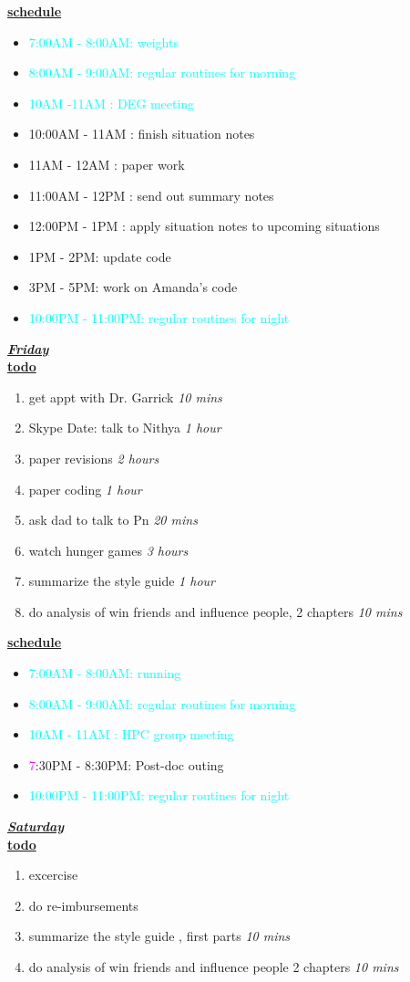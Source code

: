 \documentclass[8pt]{article}
\newcommand{\timeEst}[1]{\textit{#1}}
\newcommand{\regItem}[1]{\item \textcolor{cyan}{#1}}
\newcommand{\situationItem}[1]{\item \textcolor{magenta}{#1}}
\begin{document}
\underline{\textbf{schedule}}\\
\begin{itemize}
\regItem{7:00AM - 8:00AM: weights}
\regItem{8:00AM - 9:00AM: regular routines for morning}
\regItem {10AM -11AM : DEG meeting}
\item 10:00AM - 11AM : finish situation notes
\item 11AM - 12AM : paper work
\item 11:00AM - 12PM : send out summary notes
\item 12:00PM - 1PM : apply situation notes to upcoming situations
\item 1PM - 2PM: update code
\item 3PM - 5PM: work on Amanda's code
\regItem{10:00PM - 11:00PM: regular routines for night}
\end{itemize}
\underline{\textbf{\textit{Friday}}}\\
\underline{\textbf{todo}}\\
\begin{enumerate}
\item get appt with Dr. Garrick \timeEst{10 mins}
\item Skype Date: talk to Nithya \timeEst{1 hour}
\item paper revisions \timeEst{2 hours}
\item paper coding \timeEst{1 hour}
\item ask dad to talk to Pn \timeEst{20 mins}
\item watch hunger games \timeEst{3 hours}
\item summarize the style guide \timeEst{1 hour}
\item do analysis of win friends and influence people, 2 chapters \timeEst{10 mins}
\end{enumerate}

\underline{\textbf{schedule}}\\
\begin{itemize}
\regItem{7:00AM - 8:00AM: running}
\regItem {8:00AM - 9:00AM: regular routines for morning}
\regItem{10AM - 11AM : HPC group meeting}
\situationItem 7:30PM - 8:30PM: Post-doc outing
\regItem{10:00PM - 11:00PM: regular routines for night}
\end{itemize}

\underline{\textbf{\textit{Saturday}}}\\
\underline{\textbf{todo}}\\
\begin{enumerate}
\item excercise
\item do re-imbursements

\item summarize the style guide , first parts \timeEst{10 mins}
\item do analysis of win friends and influence people 2 chapters \timeEst{10 mins}

\end{enumerate}
\end{document}
